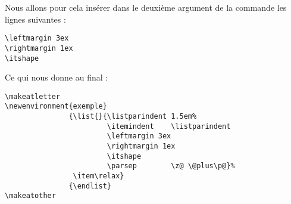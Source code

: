 Nous allons pour cela insérer dans le deuxième argument de la commande  les lignes suivantes :
\begin{verbatim}
\leftmargin 3ex
\rightmargin 1ex
\itshape
\end{verbatim}

Ce qui nous donne au final :

\begin{verbatim}
\makeatletter
\newenvironment{exemple}
               {\list{}{\listparindent 1.5em%
                        \itemindent    \listparindent
                        \leftmargin 3ex
		    			\rightmargin 1ex
		     			\itshape
                        \parsep        \z@ \@plus\p@}%
                \item\relax}
               {\endlist}
\makeatother
\end{verbatim}